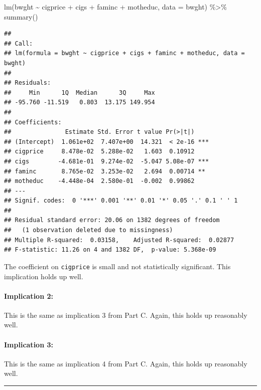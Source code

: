 \documentclass[
]{article}
\newenvironment{Shaded}{\begin{snugshade}}{\end{snugshade}}
\newcommand{\AttributeTok}[1]{\textcolor[rgb]{0.77,0.63,0.00}{#1}}
\newcommand{\FunctionTok}[1]{\textcolor[rgb]{0.00,0.00,0.00}{#1}}
\newcommand{\NormalTok}[1]{#1}
\newcommand{\SpecialCharTok}[1]{\textcolor[rgb]{0.00,0.00,0.00}{#1}}
\begin{document}
\begin{Shaded}
\begin{Highlighting}[]
\FunctionTok{lm}\NormalTok{(bwght }\SpecialCharTok{\textasciitilde{}}\NormalTok{ cigprice }\SpecialCharTok{+}\NormalTok{ cigs }\SpecialCharTok{+}\NormalTok{ faminc }\SpecialCharTok{+}\NormalTok{ motheduc, }\AttributeTok{data =}\NormalTok{ bwght) }\SpecialCharTok{\%\textgreater{}\%} \FunctionTok{summary}\NormalTok{()}
\end{Highlighting}
\end{Shaded}

\begin{verbatim}
## 
## Call:
## lm(formula = bwght ~ cigprice + cigs + faminc + motheduc, data = bwght)
## 
## Residuals:
##     Min      1Q  Median      3Q     Max 
## -95.760 -11.519   0.803  13.175 149.954 
## 
## Coefficients:
##               Estimate Std. Error t value Pr(>|t|)    
## (Intercept)  1.061e+02  7.407e+00  14.321  < 2e-16 ***
## cigprice     8.478e-02  5.288e-02   1.603  0.10912    
## cigs        -4.681e-01  9.274e-02  -5.047 5.08e-07 ***
## faminc       8.765e-02  3.253e-02   2.694  0.00714 ** 
## motheduc    -4.448e-04  2.580e-01  -0.002  0.99862    
## ---
## Signif. codes:  0 '***' 0.001 '**' 0.01 '*' 0.05 '.' 0.1 ' ' 1
## 
## Residual standard error: 20.06 on 1382 degrees of freedom
##   (1 observation deleted due to missingness)
## Multiple R-squared:  0.03158,    Adjusted R-squared:  0.02877 
## F-statistic: 11.26 on 4 and 1382 DF,  p-value: 5.368e-09
\end{verbatim}

The coefficient on \texttt{cigprice} is small and not statistically
significant. This implication holds up well.

\hypertarget{implication-2-1}{%
\paragraph{Implication 2:}\label{implication-2-1}}

This is the same as implication 3 from Part C. Again, this holds up
reasonably well.

\hypertarget{implication-3-1}{%
\paragraph{Implication 3:}\label{implication-3-1}}

This is the same as implication 4 from Part C. Again, this holds up
reasonably well.

\begin{center}\rule{0.5\linewidth}{0.5pt}\end{center}
\end{document}
